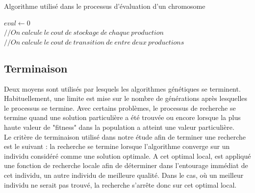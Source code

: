 	\begin{algorithm}[H]
 		\caption{Algorithme utilisé dans le processus d'évaluation d'un chromosome}
 		\label{alg:evaluation}
 		\BlankLine
 		$eval \gets 0$\\
 		$// On\ calcule\ le\ cout\ de\ stockage\ de\ chaque\ production$ \\
 		$// On\ calcule\ le\ cout\ de\ transition\ de\ entre\ deux\ productions$ \\
	\end{algorithm}
	
	\subsection{Terminaison}
	Deux moyens sont utilisés par lesquels les algorithmes génétiques se terminent. Habituellement, une limite est mise sur le nombre de générations après lesquelles le processus se termine. Avec certains problèmes, le processus de recherche se termine quand une solution particulière a été trouvée ou encore lorsque la plus haute valeur de "fitness" dans la population a atteint une valeur particulière. \\
	\hspace*{.5cm} Le critère de terminaison utilisé dans notre étude afin de terminer une recherche est le suivant : la recherche se termine lorsque l'algorithme converge sur un individu considéré comme une solution optimale. A cet optimal local, est appliqué une fonction de recherche locale afin de déterminer dans l'entourage immédiat de cet individu, un autre individu de meilleure qualité. Dans le cas, où un meilleur individu ne serait pas trouvé, la recherche s’arrête donc sur cet optimal local.
	
